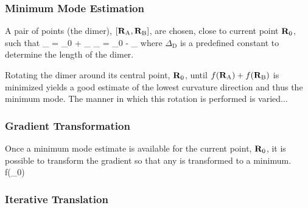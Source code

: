 \subsubsection{Minimum Mode Estimation}
A pair of points (the dimer), $[{\mathrm{\mathbf{\bm{R}}}}_\text{A}, {\mathrm{\mathbf{\bm{R}}}}_\text{B}]$, are chosen, close to current point ${\mathrm{\mathbf{\bm{R}}}}_0$, such that
\vR_ = \vR_0 + \Delta_\uvn \quad {} \quad \vR_ = \vR_0  - \Delta_\uvn
\eeq
where $\Delta_\text{D}$ is a predefined constant to determine the length of the dimer.

Rotating the dimer around its central point, ${\mathrm{\mathbf{\bm{R}}}}_0$, until $f({\mathrm{\mathbf{\bm{R}}}}_\text{A}) + f({\mathrm{\mathbf{\bm{R}}}}_\text{B})$ is minimized yields a good estimate of the lowest curvature direction and thus the minimum mode. \cite{voter-hyperdynamics-1997}
The manner in which this rotation is performed is varied...


\incomplete

\subsubsection{Gradient Transformation}
Once a minimum mode estimate is available for the current point, ${\mathrm{\mathbf{\bm{R}}}}_0$, it is possible to transform the gradient so that any  is transformed to a minimum.
\nabla{}f(\vR_0)
\eeq


\incomplete

\subsubsection{Iterative Translation}

\incomplete
